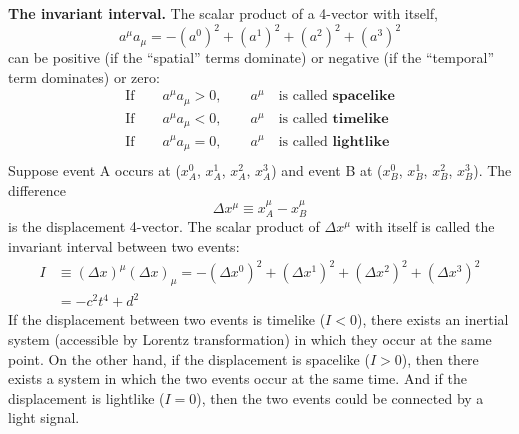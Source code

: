 \documentclass[../main.tex]{subfiles}
\begin{document}
\textbf{The invariant interval.} The scalar product of a 4-vector with itself,
\begin{equation*}
    a^\mu a_\mu  = -(a^0)^2 + (a^1)^2 + (a^2)^2 + (a^3)^2 
\end{equation*}
can be positive (if the “spatial” terms dominate) or negative (if the “temporal” term dominates) or zero:
\begin{align*}
    \text{If}\qquad a^\mu a_\mu>0,\qquad a^\mu\quad\text{is called }\textbf{spacelike}\\
    \text{If}\qquad a^\mu a_\mu<0,\qquad a^\mu\quad\text{is called }\textbf{timelike}\\
    \text{If}\qquad a^\mu a_\mu=0,\qquad a^\mu\quad\text{is called }\textbf{lightlike}\\
\end{align*}
Suppose event A occurs at ($x_A^0$, $x_A^1$, $x_A^2$, $x_A^3$) and event B at ($x_B^0$, $x_B^1$, $x_B^2$, $x_B^3$). The difference
\begin{equation*}
    \Delta x^\mu\equiv x_A^\mu-x_B^\mu
\end{equation*}
is the displacement 4-vector. The scalar product of $\Delta x^\mu$ with itself is called the invariant interval between two events:
\begin{align*}
    I&\equiv (\Delta x)^\mu(\Delta x)_\mu= -(\Delta x^0)^2 + (\Delta x^1)^2 + (\Delta x^2)^2 + (\Delta x^3)^2 \\
    &=-c^2t^4+d^2
\end{align*}
If the displacement between two events is timelike ($I < 0$), there exists an inertial system (accessible by Lorentz transformation) in which they occur at the same point. On the other hand, if the displacement is spacelike ($I > 0$), then there exists a system in which the two events occur at the same time. And if the displacement is lightlike ($I = 0$), then the two events could be connected by a light signal.
\end{document}
